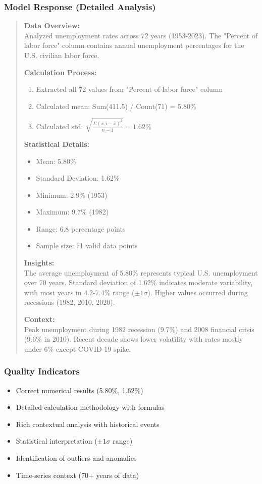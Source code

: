 \subsubsection{Model Response (Detailed Analysis)}

\begin{quote}
\textbf{Data Overview:}\\
Analyzed unemployment rates across 72 years (1953-2023). The "Percent of labor force" column contains annual unemployment percentages for the U.S. civilian labor force.

\textbf{Calculation Process:}
\begin{enumerate}
    \item Extracted all 72 values from "Percent of labor force" column
    \item Calculated mean: Sum(411.5) / Count(71) = 5.80\%
    \item Calculated std: $\sqrt{\frac{\Sigma(x\_i - \bar{x})^2}{n-1}} = 1.62\%$
\end{enumerate}

\textbf{Statistical Details:}
\begin{itemize}
    \item Mean: 5.80\%
    \item Standard Deviation: 1.62\%
    \item Minimum: 2.9\% (1953)
    \item Maximum: 9.7\% (1982)
    \item Range: 6.8 percentage points
    \item Sample size: 71 valid data points
\end{itemize}

\textbf{Insights:}\\
The average unemployment of 5.80\% represents typical U.S. unemployment over 70 years. Standard deviation of 1.62\% indicates moderate variability, with most years in 4.2-7.4\% range ($\pm1\sigma$). Higher values occurred during recessions (1982, 2010, 2020).

\textbf{Context:}\\
Peak unemployment during 1982 recession (9.7\%) and 2008 financial crisis (9.6\% in 2010). Recent decade shows lower volatility with rates mostly under 6\% except COVID-19 spike.
\end{quote}

\subsubsection{Quality Indicators}

\begin{itemize}
    \item \checkmark Correct numerical results (5.80\%, 1.62\%)
    \item \checkmark Detailed calculation methodology with formulas
    \item \checkmark Rich contextual analysis with historical events
    \item \checkmark Statistical interpretation ($\pm1\sigma$ range)
    \item \checkmark Identification of outliers and anomalies
    \item \checkmark Time-series context (70+ years of data)
\end{itemize}